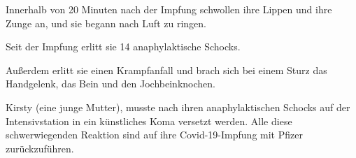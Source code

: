 Innerhalb von 20 Minuten nach der Impfung schwollen ihre Lippen und ihre Zunge
an, und sie begann nach Luft zu ringen.

Seit der Impfung erlitt sie 14 anaphylaktische Schocks.

Außerdem erlitt sie einen Krampfanfall und brach sich bei einem Sturz das
Handgelenk, das Bein und den Jochbeinknochen.

Kirsty (eine junge Mutter), musste nach ihren anaphylaktischen Schocks auf der
Intensivstation in ein künstliches Koma versetzt werden. Alle diese
schwerwiegenden Reaktion sind auf ihre Covid-19-Impfung mit Pfizer
zurückzuführen.

